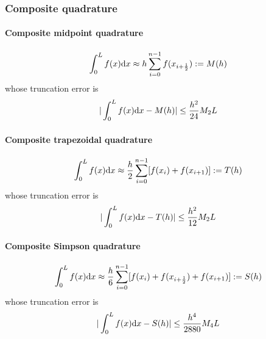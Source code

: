 \documentclass[conference,onecolumn,12pt]{IEEEtran}
\theoremstyle{definition}
\begin{document}
\subsubsection{Composite quadrature}
\paragraph{Composite midpoint quadrature}

\begin{equation}
    \int_0^L f(x) {\rm d}x \approx h\sum_{i=0}^{n-1} f(x_{i+\frac{1}{2}}):=M(h)
\end{equation}
whose truncation error is
\begin{equation}
    \label{err_1}
    |\int_0^L f(x) {\rm d}x-M(h)|\leq \frac{h^2}{24}M_2 L
\end{equation}
\paragraph{Composite trapezoidal quadrature}

\begin{equation}
    \int_0^L f(x) {\rm d}x \approx \frac{h}{2}\sum_{i=0}^{n-1} [f(x_i) + f(x_{i+1})]:=T(h)
\end{equation}
whose truncation error is
\begin{equation}
    \label{err_2}
    |\int_0^L f(x) {\rm d}x-T(h)|\leq \frac{h^2}{12}M_2L
\end{equation}
\paragraph{Composite Simpson quadrature}

\begin{equation}
    \int_0^L f(x) {\rm d}x \approx \frac{h}{6}\sum_{i=0}^{n-1} [f(x_i) + f(x_{i+\frac{1}{2}}) + f(x_{i+1})]:=S(h)
\end{equation}
whose truncation error is
\begin{equation}
    \label{err_3}
    |\int_0^L f(x) {\rm d}x-S(h)|\leq \frac{h^4}{2880}M_4L
\end{equation}
\end{document}
